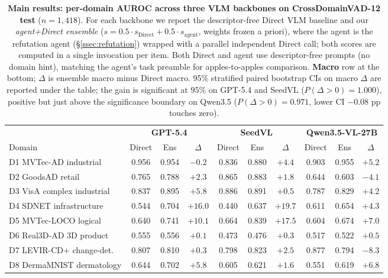 \begin{table}[t]
\centering
\caption{\textbf{Main results: per-domain AUROC across three VLM backbones on CrossDomainVAD-12 test} ($n{=}1{,}418$). For each backbone we report the descriptor-free Direct VLM baseline and our \emph{agent+Direct ensemble} ($s = 0.5\!\cdot\!s_{\mathrm{Direct}} + 0.5\!\cdot\!s_{\mathrm{agent}}$, weights frozen a priori), where the agent is the refutation agent (\S\ref{ssec:refutation}) wrapped with a parallel independent Direct call; both scores are computed in a single invocation per item. Both Direct and agent use descriptor-free prompts (no domain hint), matching the agent's task preamble for apples-to-apples comparison. \textbf{Macro} row at the bottom; $\Delta$ is ensemble macro minus Direct macro. 95\% stratified paired bootstrap CIs on macro $\Delta$ are reported under the table; the gain is significant at $95\%$ on GPT-5.4 and SeedVL ($P(\Delta\!>\!0){=}1.000$), positive but just above the significance boundary on Qwen3.5 ($P(\Delta\!>\!0){=}0.971$, lower CI $-0.08$ pp touches zero).}
\label{tab:main_results}
\small
\setlength{\tabcolsep}{3.8pt}
\begin{tabular}{l|ccc|ccc|ccc}
\toprule
& \multicolumn{3}{c|}{\textbf{GPT-5.4}} & \multicolumn{3}{c|}{\textbf{SeedVL}} & \multicolumn{3}{c}{\textbf{Qwen3.5-VL-27B}} \\
Domain & Direct & Ens & $\Delta$ & Direct & Ens & $\Delta$ & Direct & Ens & $\Delta$ \\
\midrule
D1  MVTec-AD industrial       & 0.956 & 0.954 & $-0.2$ & 0.836 & 0.880 & $+4.4$ & 0.903 & 0.955 & $+5.2$ \\
D2  GoodsAD retail            & 0.765 & 0.788 & $+2.3$ & 0.865 & 0.883 & $+1.8$ & 0.644 & 0.603 & $-4.1$ \\
D3  VisA complex industrial   & 0.837 & 0.895 & $+5.8$ & 0.886 & 0.891 & $+0.5$ & 0.787 & 0.829 & $+4.2$ \\
D4  SDNET infrastructure      & 0.544 & 0.704 & $+16.0$& 0.440 & 0.637 & $+19.7$& 0.611 & 0.654 & $+4.3$ \\
D5  MVTec-LOCO logical        & 0.640 & 0.741 & $+10.1$& 0.664 & 0.839 & $+17.5$& 0.604 & 0.674 & $+7.0$ \\
D6  Real3D-AD 3D product      & 0.555 & 0.556 & $+0.1$ & 0.473 & 0.476 & $+0.3$ & 0.517 & 0.522 & $+0.5$ \\
D7  LEVIR-CD+ change-det.     & 0.807 & 0.810 & $+0.3$ & 0.798 & 0.823 & $+2.5$ & 0.877 & 0.794 & $-8.3$ \\
D8  DermaMNIST dermatology    & 0.644 & 0.702 & $+5.8$ & 0.605 & 0.621 & $+1.6$ & 0.551 & 0.619 & $+6.8$ \\

\end{tabular}
\end{table}
